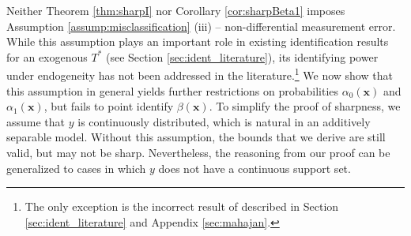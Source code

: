 Neither Theorem \ref{thm:sharpI} nor Corollary \ref{cor:sharpBeta1} imposes Assumption \ref{assump:misclassification} (iii) -- non-differential measurement error.
While this assumption plays an important role in existing identification results for an exogenous $T^*$ (see Section \ref{sec:ident_literature}), its identifying power under endogeneity has not been addressed in the literature.\footnote{The only exception is the incorrect result of \cite{Mahajan} described in Section \ref{sec:ident_literature} and Appendix \ref{sec:mahajan}.}
We now show that this assumption in general yields further restrictions on probabilities $\alpha_0(\mathbf{x})$ and $\alpha_1(\mathbf{x})$, but fails to point identify $\beta(\mathbf{x})$.
To simplify the proof of sharpness, we assume that $y$ is continuously distributed, which is natural in an additively separable model.
Without this assumption, the bounds that we derive are still valid, but may not be sharp. 
Nevertheless, the reasoning from our proof can be generalized to cases in which $y$ does not have a continuous support set.


